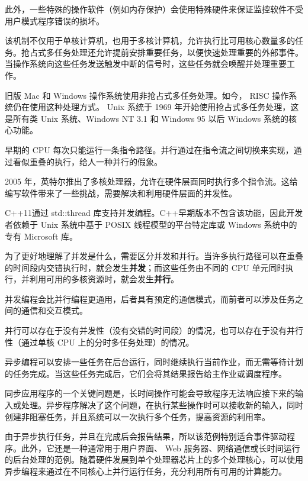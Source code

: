 此外，一些特殊的操作软件（例如内存保护）会使用特殊硬件来保证监控软件不受用户模式程序错误的损坏。

该机制不仅用于单核计算机，也用于多核计算机，允许执行比可用核心数量多的任务。抢占式多任务处理还允许提前安排重要任务，以便快速处理重要的外部事件。当操作系统向这些任务发送触发中断的信号时，这些任务就会唤醒并处理重要工作。

旧版 Mac 和 Windows 操作系统使用非抢占式多任务处理。如今， RISC 操作系统仍在使用这种处理方式。 Unix 系统于 1969 年开始使用抢占式多任务处理，这是所有类 Unix 系统、Windows NT 3.1 和 Windows 95 以后 Windows 系统的核心功能。

早期的 CPU 每次只能运行一条指令路径。并行通过在指令流之间切换来实现，通过看似重叠的执行，给人一种并行的假象。

2005 年，英特尔推出了多核处理器，允许在硬件层面同时执行多个指令流。这给编写软件带来了一些挑战，需要解决和利用硬件层面的并发性。

C++11通过 std::thread 库支持并发编程。C++早期版本不包含该功能，因此开发者依赖于 Unix 系统中基于 POSIX 线程模型的平台特定库或 Windows 系统中的专有 Microsoft 库。

为了更好地理解了并发是什么，需要区分并发和并行。当许多执行路径可以在重叠的时间段内交错执行时，就会发生\textbf{并发}；而这些任务由不同的 CPU 单元同时执行，并利用可用的多核资源时，就会发生\textbf{并行}。


并发编程会比并行编程更通用，后者具有预定的通信模式，而前者可以涉及任务之间的通信和交互模式。

并行可以存在于没有并发性（没有交错的时间段）的情况，也可以存在于没有并行性（通过单核 CPU 上的分时多任务处理）的情况。


异步编程可以安排一些任务在后台运行，同时继续执行当前作业，而无需等待计划的任务完成。当这些任务完成后，它们会将其结果报告给主作业或调度程序。

同步应用程序的一个关键问题是，长时间操作可能会导致程序无法响应接下来的输入或处理。异步程序解决了这个问题，在执行某些操作时可以接收新的输入，同时创建非阻塞任务，并且系统可以一次执行多个任务，提高资源的利用率。

由于异步执行任务，并且在完成后会报告结果，所以该范例特别适合事件驱动程序。此外，它还是一种通常用于用户界面、 Web 服务器、网络通信或长时间运行的后台处理的范例。随着硬件发展到单个处理器芯片上的多个处理核心，可以使用异步编程来通过在不同核心上并行运行任务，充分利用所有可用的计算能力。

